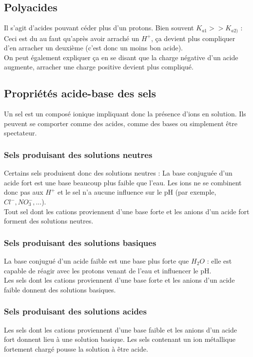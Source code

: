 \documentclass[12pt, a4paper]{article}
\begin{document}
\subsection{Polyacides}
Il s'agit d'acides pouvant céder plus d'un protons. Bien souvent $K_{a1} >> K_{a2)}$ : Ceci est du au faut qu'après avoir arraché un $H^+$, ça devient plus compliquer d'en arracher un deuxième (c'est donc un moins bon acide).\\
On peut également expliquer ça en se disant que la charge négative d'un acide augmente, arracher une charge positive devient plus compliqué.

\subsection{Propriétés acide-base des sels}
Un sel est un composé ionique impliquant donc la présence d'ions en solution. Ils peuvent se comporter comme des acides, comme des bases ou simplement être spectateur. \\

\subsubsection{Sels produisant des solutions neutres}
Certains sels produisent donc des solutions neutres : La base conjuguée d'un acide fort est une base beaucoup plus faible que l'eau. Les ions ne se combinent donc pas aux $H^+$ et le sel n'a aucune influence sur le pH (par exemple, $Cl^-, NO_3^-, ...$).\\
Tout sel dont les cations proviennent d'une base forte et les anions d'un acide fort forment des solutions neutres.

\subsubsection{Sels produisant des solutions basiques}
La base conjugué d'un acide faible est une base plus forte que $H_2O$ : elle est capable de réagir avec les protons venant de l'eau et influencer le pH.\\
Les sels dont les cations proviennent d'une base forte et les anions d'un acide faible donnent des solutions basiques.

\subsubsection{Sels produisant des solutions acides}
Les sels dont les cations proviennent d'une base faible et les anions d'un acide fort donnent lieu à une solution basique. Les sels contenant un ion métallique fortement chargé pousse la solution à être acide. 
\end{document}
